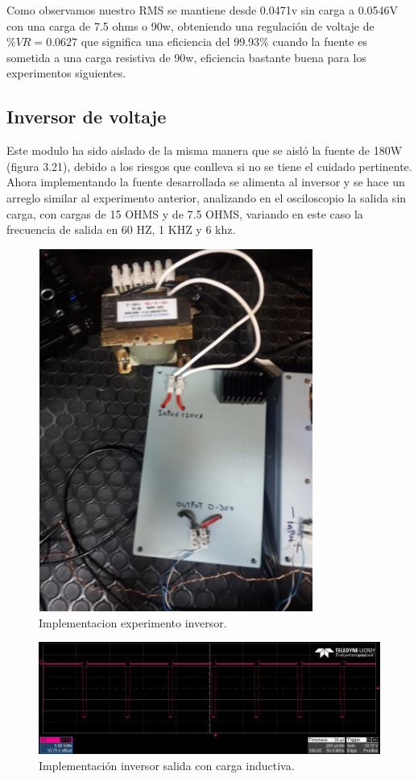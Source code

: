 Como observamos nuestro RMS se mantiene desde 0.0471v sin carga a 0.0546V con una carga de 7.5 ohms o 90w, obteniendo una regulación de voltaje de $\%VR=0.0627$ que significa una eficiencia del 99.93\% cuando la fuente es sometida a una carga resistiva de 90w, eficiencia bastante buena para los experimentos siguientes. 

\subsection{Inversor de voltaje}

Este modulo ha sido aislado de la misma manera que se aisló la fuente de 180W (figura 3.21), debido a los riesgos que conlleva si no se tiene el cuidado pertinente. Ahora implementando la fuente desarrollada se alimenta al inversor y se hace un arreglo similar al experimento anterior, analizando en el osciloscopio la salida sin carga, con cargas de 15 OHMS y de 7.5 OHMS, variando en este caso la frecuencia de salida en 60 HZ, 1 KHZ y 6 khz.



\begin{figure}[H]
\centering
\includegraphics[width=9cm]{Capitulo3/figs/fotofuente.png}
\caption{Implementacion experimento inversor.}
\end{figure}

\begin{figure}[H]
\centering
\includegraphics[width=12cm]{Capitulo3/figs/pwm1.jpg}
\caption{Implementación inversor salida con carga inductiva.}
\end{figure}



